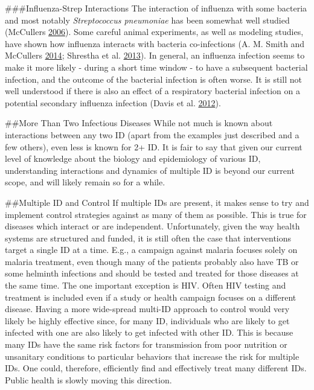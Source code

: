 \documentclass[]{book}
\theoremstyle{definition}
\theoremstyle{definition}
\theoremstyle{definition}
\theoremstyle{remark}
\begin{document}
\#\#\#Influenza-Strep Interactions The interaction of influenza with
some bacteria and most notably \emph{Streptococcus pneumoniae} has been
somewhat well studied (McCullers
\protect\hyperlink{ref-mccullers06}{2006}). Some careful animal
experiments, as well as modeling studies, have shown how influenza
interacts with bacteria co-infections (A. M. Smith and McCullers
\protect\hyperlink{ref-smith14a}{2014}; Shrestha et al.
\protect\hyperlink{ref-shrestha13}{2013}). In general, an influenza
infection seems to make it more likely - during a short time window - to
have a subsequent bacterial infection, and the outcome of the bacterial
infection is often worse. It is still not well understood if there is
also an effect of a respiratory bacterial infection on a potential
secondary influenza infection (Davis et al.
\protect\hyperlink{ref-davis12}{2012}).

\#\#More Than Two Infectious Diseases While not much is known about
interactions between any two ID (apart from the examples just described
and a few others), even less is known for 2+ ID. It is fair to say that
given our current level of knowledge about the biology and epidemiology
of various ID, understanding interactions and dynamics of multiple ID is
beyond our current scope, and will likely remain so for a while.

\#\#Multiple ID and Control If multiple IDs are present, it makes sense
to try and implement control strategies against as many of them as
possible. This is true for diseases which interact or are independent.
Unfortunately, given the way health systems are structured and funded,
it is still often the case that interventions target a single ID at a
time. E.g., a campaign against malaria focuses solely on malaria
treatment, even though many of the patients probably also have TB or
some helminth infections and should be tested and treated for those
diseases at the same time. The one important exception is HIV. Often HIV
testing and treatment is included even if a study or health campaign
focuses on a different disease. Having a more wide-spread multi-ID
approach to control would very likely be highly effective since, for
many ID, individuals who are likely to get infected with one are also
likely to get infected with other ID. This is because many IDs have the
same risk factors for transmission from poor nutrition or unsanitary
conditions to particular behaviors that increase the risk for multiple
IDs. One could, therefore, efficiently find and effectively treat many
different IDs. Public health is slowly moving this direction.
\end{document}
